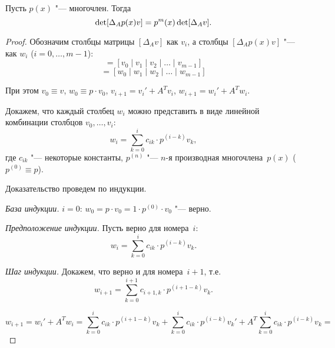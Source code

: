 \begin{proposition}
Пусть $p(x)$ "--- многочлен. Тогда
\begin{equation*}
    \mathop{\rm det}[\Delta_A p(x)v] = p^{m}(x)\mathop{\rm det}[\Delta_A v].
\end{equation*}
\end{proposition}

\begin{proof}

Обозначим столбцы матрицы $[\Delta_A v]$ как $v_i$, а столбцы $[\Delta_A p(x)v]$ "--- как $w_i$ ($i = 0, \dots, m - 1$):
\begin{equation*}
    [\Delta_A v] = [v_0 \mid v_1 \mid v_2 \mid \dots \mid v_{m-1}]
\end{equation*}
\begin{equation*}
    [\Delta_A p(x)v] = [w_0 \mid w_1 \mid w_2 \mid \dots \mid w_{m-1}]
\end{equation*}

При этом $v_0 \equiv v$, $w_0 \equiv p \cdot v_0$, $v_{i+1} = v_{i}' + A^T v_{i}$, $w_{i+1} = w_{i}' + A^T w_{i}$.

Докажем, что каждый столбец $w_i$ можно представить в виде
линейной комбинации столбцов $v_0, \dots, v_i$:
\begin{equation*}
    w_i = \sum\limits_{k = 0}^i c_{ik} \cdot p^{(i - k)} v_k,
\end{equation*}
где $c_{ik}$ "--- некоторые константы, $p^{(n)}$ "--- $n$-я производная многочлена~$p(x)$ ($p^{(0)} \equiv p$).

Доказательство проведем по индукции.

\emph{База индукции.} $i = 0$: $w_0 = p \cdot v_0 = 1 \cdot p^{(0)} \cdot v_0$ "--- верно.

\emph{Предположение индукции.} Пусть верно для номера~$i$:
\begin{equation*}
    w_i = \sum\limits_{k = 0}^i c_{ik} \cdot p^{(i - k)} v_k.
\end{equation*}

\emph{Шаг индукции.} Докажем, что верно и для номера~$i + 1$, т.е.
\begin{equation*}
    w_{i+1} = \sum\limits_{k = 0}^{i+1} c_{i+1, k} \cdot p^{(i + 1 - k)} v_k.
\end{equation*}

\begin{equation*}
    w_{i+1} = w_{i}' + A^T w_{i} = \sum\limits_{k = 0}^i c_{ik} \cdot p^{(i + 1 - k)} v_k +
    \sum\limits_{k = 0}^i c_{ik} \cdot p^{(i - k)} v_k' + A^T \sum\limits_{k = 0}^i c_{ik} \cdot p^{(i - k)} v_k =
\end{equation*}


\end{proof}
